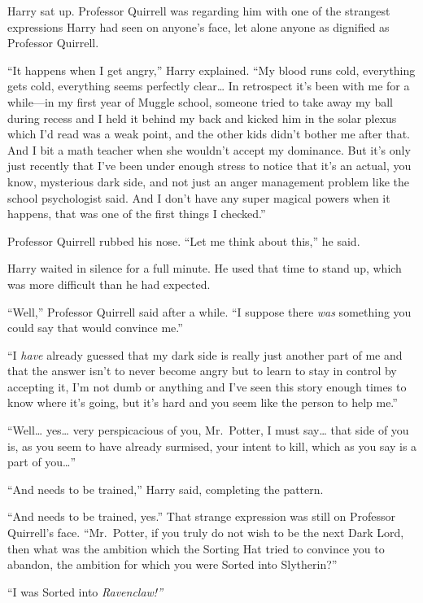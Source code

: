 Harry sat up. Professor Quirrell was regarding him with one of the
strangest expressions Harry had seen on anyone's face, let alone anyone
as dignified as Professor Quirrell.

``It happens when I get angry,'' Harry explained. ``My blood runs cold,
everything gets cold, everything seems perfectly clear\ldots{} In
retrospect it's been with me for a while---in my first year of Muggle
school, someone tried to take away my ball during recess and I held it
behind my back and kicked him in the solar plexus which I'd read was a
weak point, and the other kids didn't bother me after that. And I bit a
math teacher when she wouldn't accept my dominance. But it's only just
recently that I've been under enough stress to notice that it's an
actual, you know, mysterious dark side, and not just an anger management
problem like the school psychologist said. And I don't have any super
magical powers when it happens, that was one of the first things I
checked.''

Professor Quirrell rubbed his nose. ``Let me think about this,'' he
said.

Harry waited in silence for a full minute. He used that time to stand
up, which was more difficult than he had expected.

``Well,'' Professor Quirrell said after a while. ``I suppose there
\emph{was} something you could say that would convince me.''

``I \emph{have} already guessed that my dark side is really just another
part of me and that the answer isn't to never become angry but to learn
to stay in control by accepting it, I'm not dumb or anything and I've
seen this story enough times to know where it's going, but it's hard and
you seem like the person to help me.''

``Well\ldots{} yes\ldots{} very perspicacious of you, Mr.~Potter, I must
say\ldots{} that side of you is, as you seem to have already surmised,
your intent to kill, which as you say is a part of you\ldots{}''

``And needs to be trained,'' Harry said, completing the pattern.

``And needs to be trained, yes.'' That strange expression was still on
Professor Quirrell's face. ``Mr.~Potter, if you truly do not wish to be
the next Dark Lord, then what was the ambition which the Sorting Hat
tried to convince you to abandon, the ambition for which you were Sorted
into Slytherin?''

``I was Sorted into \emph{Ravenclaw!''}

